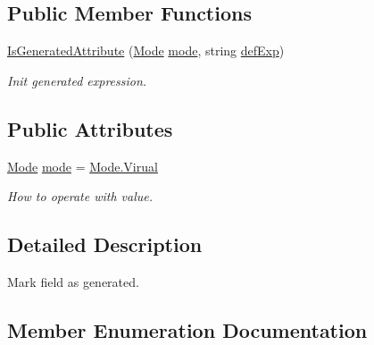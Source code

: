 \subsection*{Public Member Functions}
\begin{DoxyCompactItemize}
\item 
\mbox{\hyperlink{class_uniform_data_operator_1_1_sql_1_1_markup_1_1_is_generated_attribute_a03bea379c3a0e0694e9a29eba9b11797}{Is\+Generated\+Attribute}} (\mbox{\hyperlink{class_uniform_data_operator_1_1_sql_1_1_markup_1_1_is_generated_attribute_a03e5e76ff63dbcf2cca5746e3098b23d}{Mode}} \mbox{\hyperlink{class_uniform_data_operator_1_1_sql_1_1_markup_1_1_is_generated_attribute_a026c142857b7314d18d3031c76a74c41}{mode}}, string \mbox{\hyperlink{class_uniform_data_operator_1_1_sql_1_1_markup_1_1_default_attribute_a64185e68bab327c41b4b7424ef88677b}{def\+Exp}})
\begin{DoxyCompactList}\small\item\em Init generated expression. \end{DoxyCompactList}\end{DoxyCompactItemize}
\subsection*{Public Attributes}
\begin{DoxyCompactItemize}
\item 
\mbox{\hyperlink{class_uniform_data_operator_1_1_sql_1_1_markup_1_1_is_generated_attribute_a03e5e76ff63dbcf2cca5746e3098b23d}{Mode}} \mbox{\hyperlink{class_uniform_data_operator_1_1_sql_1_1_markup_1_1_is_generated_attribute_a026c142857b7314d18d3031c76a74c41}{mode}} = \mbox{\hyperlink{class_uniform_data_operator_1_1_sql_1_1_markup_1_1_is_generated_attribute_a03e5e76ff63dbcf2cca5746e3098b23daa6d194ab7efe0417c28a02b8a8997bd0}{Mode.\+Virual}}
\begin{DoxyCompactList}\small\item\em How to operate with value. \end{DoxyCompactList}\end{DoxyCompactItemize}


\subsection{Detailed Description}
Mark field as generated. 



\subsection{Member Enumeration Documentation}
\mbox{\label{class_uniform_data_operator_1_1_sql_1_1_markup_1_1_is_generated_attribute_a03e5e76ff63dbcf2cca5746e3098b23d}} 
